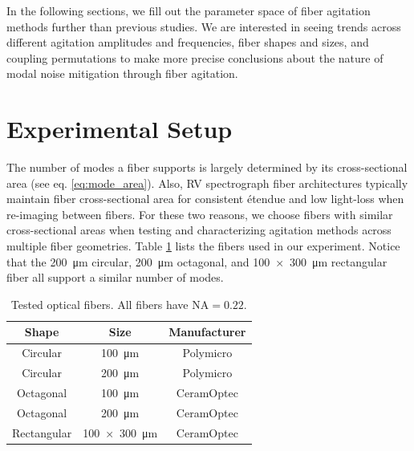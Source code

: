 \documentclass[twocolumn]{emulateapj}
\begin{document}
In the following sections, we fill out the parameter space of fiber agitation methods further than previous studies. We are interested in seeing trends across different agitation amplitudes and frequencies, fiber shapes and sizes, and coupling permutations to make more precise conclusions about the nature of modal noise mitigation through fiber agitation.

\section{Experimental Setup}
\label{sec:experimental_setup}

The number of modes a fiber supports is largely determined by its cross-sectional area (see eq. \ref{eq:mode_area}). Also, RV spectrograph fiber architectures typically maintain fiber cross-sectional area for consistent \'etendue and low light-loss when re-imaging between fibers. For these two reasons, we choose fibers with similar cross-sectional areas when testing and characterizing agitation methods across multiple fiber geometries. Table \ref{table:fibers} lists the fibers used in our experiment. Notice that the \SI{200}{\micro\meter} circular, \SI{200}{\micro\meter} octagonal, and \SI{100x300}{\micro\meter} rectangular fiber all support a similar number of modes.

\begin{table}
\centering
\caption{Tested optical fibers. All fibers have $\mathrm{NA} = 0.22$.}
	\begin{tabular}{ccc}
	\hline
	Shape & Size & Manufacturer \\
	\hline
	\hline
	Circular & \SI{100}{\micro\meter} & Polymicro \\
	Circular & \SI{200}{\micro\meter} & Polymicro \\
	Octagonal & \SI{100}{\micro\meter} & CeramOptec \\
	Octagonal & \SI{200}{\micro\meter} & CeramOptec \\
	Rectangular & \SI{100x300}{\micro\meter} & CeramOptec \\
	\hline
	\end{tabular}
\label{table:fibers}
\end{table}
\end{document}
